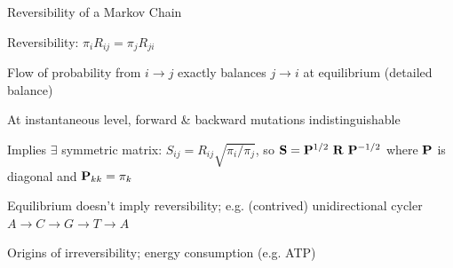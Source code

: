 \documentclass{beamer}
\begin{document}
\begin{frame}{Reversibility of a Markov Chain}

\itemb
\item \alert{Reversibility}: $\pi_i R_{ij} = \pi_j R_{ji}$
 \itemb
 \item Flow of probability from $i \to j$ exactly balances $j \to i$ at equilibrium (\alert{detailed balance})
%
 \item At instantaneous level, forward \& backward mutations indistinguishable
\pause
 \item Implies $\exists$ symmetric matrix: $S_{ij} = R_{ij} \sqrt{\pi_i/\pi_j}$, so ${\bf S} = {\bf P}^{1/2}\ {\bf R}\ {\bf P}^{-1/2}$ where ${\bf P}$ is diagonal and ${\bf P}_{kk} = \pi_k$
\pause
 \item Equilibrium doesn't imply reversibility; e.g. (contrived) unidirectional cycler $A \to C \to G \to T \to A$
\pause
 \iteme
\item Origins of irreversibility; energy consumption (e.g. ATP)
\iteme

\end{frame}



% 
\end{document}
